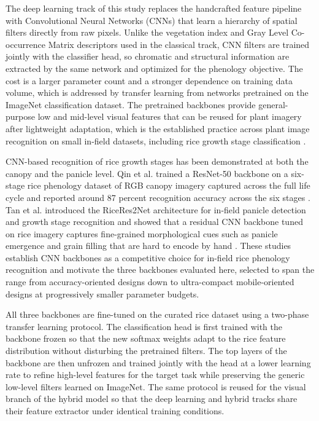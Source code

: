 The deep learning track of this study replaces the handcrafted feature pipeline with Convolutional Neural Networks (CNNs) that learn a hierarchy of spatial filters directly from raw pixels. Unlike the vegetation index and Gray Level Co-occurrence Matrix descriptors used in the classical track, CNN filters are trained jointly with the classifier head, so chromatic and structural information are extracted by the same network and optimized for the phenology objective. The cost is a larger parameter count and a stronger dependence on training data volume, which is addressed by transfer learning from networks pretrained on the ImageNet classification dataset. The pretrained backbones provide general-purpose low and mid-level visual features that can be reused for plant imagery after lightweight adaptation, which is the established practice across plant image recognition on small in-field datasets, including rice growth stage classification \cite{pacal2024dlplantdisease,qin2023ricephenology}.

CNN-based recognition of rice growth stages has been demonstrated at both the canopy and the panicle level. Qin et al. trained a ResNet-50 backbone on a six-stage rice phenology dataset of RGB canopy imagery captured across the full life cycle and reported around 87 percent recognition accuracy across the six stages \cite{qin2023ricephenology}. Tan et al. introduced the RiceRes2Net architecture for in-field panicle detection and growth stage recognition and showed that a residual CNN backbone tuned on rice imagery captures fine-grained morphological cues such as panicle emergence and grain filling that are hard to encode by hand \cite{tan2023riceres2net}. These studies establish CNN backbones as a competitive choice for in-field rice phenology recognition and motivate the three backbones evaluated here, selected to span the range from accuracy-oriented designs down to ultra-compact mobile-oriented designs at progressively smaller parameter budgets.

All three backbones are fine-tuned on the curated rice dataset using a two-phase transfer learning protocol. The classification head is first trained with the backbone frozen so that the new softmax weights adapt to the rice feature distribution without disturbing the pretrained filters. The top layers of the backbone are then unfrozen and trained jointly with the head at a lower learning rate to refine high-level features for the target task while preserving the generic low-level filters learned on ImageNet. The same protocol is reused for the visual branch of the hybrid model so that the deep learning and hybrid tracks share their feature extractor under identical training conditions.

